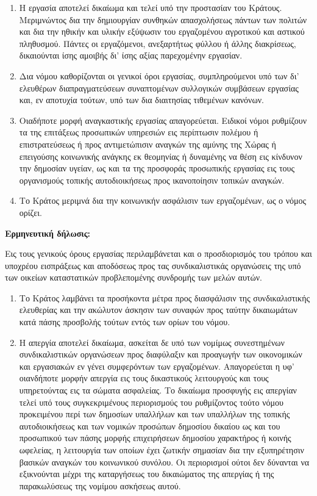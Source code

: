 \documentclass[twoside, a4paper, 10pt]{article}
\begin{document}
\begin{multicols}{2}
\begin{enumerate}
\begin{BigQuote}
\begin{enumerate}
  \item[1.] Η εργασία αποτελεί δικαίωμα και τελεί υπό την προστασίαν του Κράτους. Μεριμνώντος δια την δημιουργίαν συνθηκών απασχολήσεως πάντων των πολιτών και δια την ηθικήν και υλικήν εξύψωσιν του εργαζομένου αγροτικού και αστικού πληθυσμού. Πάντες οι εργαζόμενοι, ανεξαρτήτως φύλλου ή άλλης διακρίσεως, δικαιούνται ίσης αμοιβής  δι' ίσης αξίας παρεχομένην εργασίαν.
  \item[2.] Δια νόμου καθορίζονται οι γενικοί όροι εργασίας, συμπληρούμενοι υπό των δι' ελευθέρων διαπραγματεύσεων συναπτομένων συλλογικών συμβάσεων εργασίας και, εν αποτυχία τούτων, υπό των δια διαιτησίας τιθεμένων κανόνων.
  \item[3.] Οιαδήποτε μορφή αναγκαστικής εργασίας απαγορεύεται. Ειδικοί νόμοι ρυθμίζουν τα της επιτάξεως προσωπικών υπηρεσιών εις περίπτωσιν πολέμου ή επιστρατεύσεως ή προς αντιμετώπισιν αναγκών της αμύνης της Χώρας ή επειγούσης κοινωνικής ανάγκης εκ θεομηνίας ή δυναμένης να θέση εις κίνδυνον την δημοσίαν υγείαν, ως και τα της προσφοράς προσωπικής εργασίας εις τους οργανισμούς τοπικής αυτοδιοικήσεως προς ικανοποίησιν τοπικών αναγκών.
  \item[4.] Το Κράτος μεριμνά δια την κοινωνικήν ασφάλισιν των εργαζομένων, ως ο νόμος ορίζει.
\end{enumerate}
\textbf{Ερμηνευτική δήλωσις:}

Εις τους γενικούς όρους εργασίας περιλαμβάνεται και ο προσδιορισμός του τρόπου και υποχρέου εισπράξεως και αποδόσεως προς τας συνδικαλιστικάς οργανώσεις της υπό των οικείων καταστατικών προβλεπομένης συνδρομής των μελών αυτών.

\begin{enumerate}
  \item[1.] Το Κράτος λαμβάνει τα προσήκοντα μέτρα προς διασφάλισιν της συνδικαλιστικής ελευθερίας και την ακώλυτον άσκησιν των συναφών προς ταύτην δικαιωμάτων κατά πάσης προσβολής τούτων εντός των ορίων του νόμου.
  \item[2.] Η απεργία αποτελεί δικαίωμα, ασκείται δε υπό των νομίμως συνεστημένων συνδικαλιστικών οργανώσεων προς διαφύλαξιν και προαγωγήν των οικονομικών και εργασιακών εν γένει συμφερόντων των εργαζομένων.
Απαγορεύεται η υφ' οιανδήποτε μορφήν απεργία εις τους δικαστικούς λειτουργούς και τους υπηρετούντας εις τα σώματα ασφαλείας. Το δικαίωμα προσφυγής εις απεργίαν τελεί υπό τους συγκεκριμένους περιορισμούς του ρυθμίζοντος τούτο νόμου προκειμένου περί των δημοσίων υπαλλήλων και των υπαλλήλων της τοπικής αυτοδιοικήσεως και των νομικών προσώπων δημοσίου δικαίου ως και του προσωπικού των πάσης μορφής επιχειρήσεων δημοσίου χαρακτήρος ή κοινής ωφελείας, η  λειτουργία των οποίων  έχει ζωτικήν σημασίαν δια την εξυπηρέτησιν βασικών αναγκών του κοινωνικού συνόλου. Οι περιορισμοί ούτοι δεν δύνανται να εξικνούνται μέχρι της καταργήσεως  του δικαιώματος της απεργίας  ή της παρακωλύσεως της νομίμου ασκήσεως αυτού.
\end{enumerate}


\end{BigQuote}
\end{enumerate}
\end{multicols}
\end{document}
